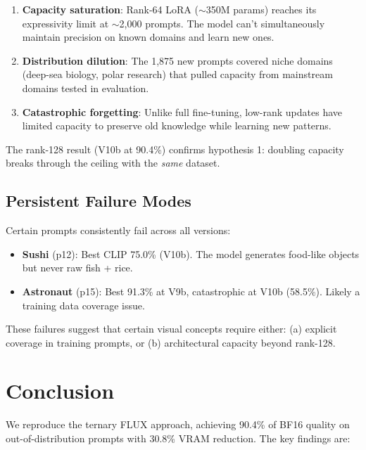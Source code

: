 \documentclass[10pt,twocolumn]{article}
\begin{document}
\begin{enumerate}[nosep,leftmargin=*]
  \item \textbf{Capacity saturation}: Rank-64 LoRA ($\sim$350M params) reaches its expressivity limit at $\sim$2{,}000 prompts. The model can't simultaneously maintain precision on known domains and learn new ones.
  \item \textbf{Distribution dilution}: The 1{,}875 new prompts covered niche domains (deep-sea biology, polar research) that pulled capacity from mainstream domains tested in evaluation.
  \item \textbf{Catastrophic forgetting}: Unlike full fine-tuning, low-rank updates have limited capacity to preserve old knowledge while learning new patterns.
\end{enumerate}

The rank-128 result (V10b at 90.4\%) confirms hypothesis 1: doubling capacity breaks through the ceiling with the \emph{same} dataset.

\subsection{Persistent Failure Modes}

Certain prompts consistently fail across all versions:
\begin{itemize}[nosep,leftmargin=*]
  \item \textbf{Sushi} (p12): Best CLIP 75.0\% (V10b). The model generates food-like objects but never raw fish + rice.
  \item \textbf{Astronaut} (p15): Best 91.3\% at V9b, catastrophic at V10b (58.5\%). Likely a training data coverage issue.
\end{itemize}

These failures suggest that certain visual concepts require either: (a) explicit coverage in training prompts, or (b) architectural capacity beyond rank-128.

\section{Conclusion}

We reproduce the ternary FLUX approach, achieving 90.4\% of BF16 quality on out-of-distribution prompts with 30.8\% VRAM reduction.
The key findings are:
\end{document}
